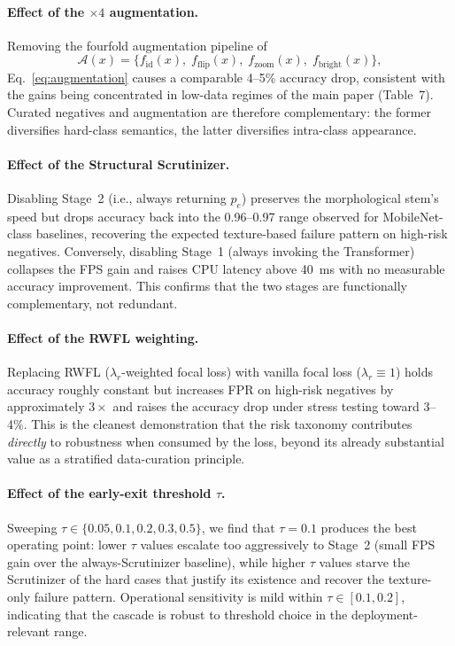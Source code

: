 \documentclass{bmvc2k}
\begin{document}
\paragraph{Effect of the $\times4$ augmentation.} Removing the fourfold augmentation pipeline of 
\begin{equation}
\mathcal{A}(x) = \{f_{\mathrm{id}}(x),\; f_{\mathrm{flip}}(x),\; f_{\mathrm{zoom}}(x),\; f_{\mathrm{bright}}(x)\},
\label{eq:augmentation}
\end{equation} Eq.~\eqref{eq:augmentation} causes a comparable 4--5\% accuracy drop, consistent with the gains being concentrated in low-data regimes of the main paper (Table~7). Curated negatives and augmentation are therefore complementary: the former diversifies hard-class semantics, the latter diversifies intra-class appearance.

\paragraph{Effect of the Structural Scrutinizer.} Disabling Stage~2 (i.e., always returning $p_{e}$) preserves the morphological stem's speed but drops accuracy back into the 0.96--0.97 range observed for MobileNet-class baselines, recovering the expected texture-based failure pattern on high-risk negatives. Conversely, disabling Stage~1 (always invoking the Transformer) collapses the FPS gain and raises CPU latency above 40~ms with no measurable accuracy improvement. This confirms that the two stages are functionally complementary, not redundant.

\paragraph{Effect of the RWFL weighting.} Replacing RWFL ($\lambda_{r}$-weighted focal loss) with vanilla focal loss ($\lambda_{r}{\equiv}1$) holds accuracy roughly constant but increases FPR on high-risk negatives by approximately $3{\times}$ and raises the accuracy drop under stress testing toward 3--4\%. This is the cleanest demonstration that the risk taxonomy contributes \emph{directly} to robustness when consumed by the loss, beyond its already substantial value as a stratified data-curation principle.

\paragraph{Effect of the early-exit threshold $\tau$.} Sweeping $\tau \in \{0.05, 0.1, 0.2, 0.3, 0.5\}$, we find that $\tau{=}0.1$ produces the best operating point: lower $\tau$ values escalate too aggressively to Stage~2 (small FPS gain over the always-Scrutinizer baseline), while higher $\tau$ values starve the Scrutinizer of the hard cases that justify its existence and recover the texture-only failure pattern. Operational sensitivity is mild within $\tau \in [0.1, 0.2]$, indicating that the cascade is robust to threshold choice in the deployment-relevant range.
\end{document}

